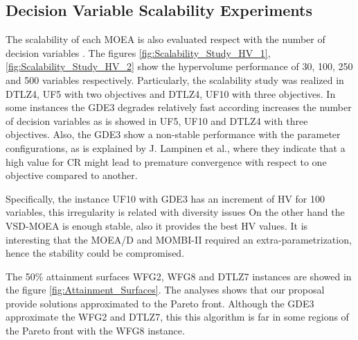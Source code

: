 %
%
%

\subsection{Decision Variable Scalability Experiments}

The scalability of each MOEA is also evaluated respect with the number of decision variables \cite{Joel:ScalabilityStudy}. 
%
The figures \ref{fig:Scalability_Study_HV_1}, \ref{fig:Scalability_Study_HV_2} show the hypervolume performance of 30, 100, 250 and 500 variables respectively.
%
Particularly,  the scalability study was realized in DTLZ4, UF5 with two objectives and DTLZ4, UF10 with three objectives.
%
In some instances the GDE3 degrades relatively fast according increases the number of decision variables as is showed in UF5, UF10 and DTLZ4 with three objectives.
%
Also, the GDE3 show a non-stable performance with the parameter configurations, as is explained by J. Lampinen et al.\cite{Joel:GDE3_CEC09}, where they indicate that a high value for CR might lead to premature convergence with respect to one objective compared to another.

%
Specifically, the instance UF10 with GDE3 has an increment of HV for 100 variables, this irregularity is related with diversity issues \cite{Joel:GDE3_CEC09}
%
On the other hand the VSD-MOEA is enough stable, also it provides the best HV values.
%
It is interesting that the MOEA/D and MOMBI-II required an extra-parametrization, hence the stability could be compromised.

%
The 50\% attainment surfaces WFG2, WFG8 and DTLZ7 instances are showed in the figure \ref{fig:Attainment_Surfaces}.
%
The analyses shows that our proposal provide solutions approximated to the Pareto front.
%
Although the GDE3 approximate the WFG2 and DTLZ7, this this algorithm is far in some regions of the Pareto front with the WFG8 instance. 

\begin{figure}[t]
\centering

\label{fig:variable-decision-scalability-2obj}
\end{figure}


